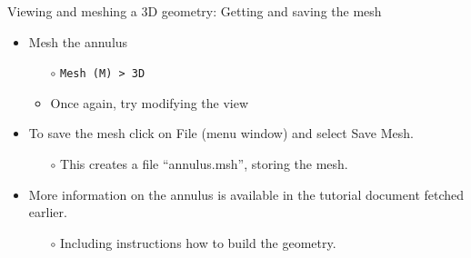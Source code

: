 \documentclass[t]{beamer}
\begin{document}
\begin{frame}{Viewing and meshing a 3D geometry: Getting and saving the mesh}
\begin{itemize}
\item Mesh the annulus
\begin{itemize}
  \item[$\circ$] \lstinline{Mesh (M) > 3D}
  \item[$\circ$] Once again, try modifying the view
\end{itemize}
\vspace{5pt}
\item To save the mesh click on File (menu window) and select Save Mesh.
\begin{itemize}
  \item[$\circ$] This creates a file ``annulus.msh'', storing the mesh.
\end{itemize}
\vspace{5pt}
\item More information on the annulus is available in the tutorial document fetched earlier.
\begin{itemize}
  \item[$\circ$] Including instructions how to build the geometry.
\end{itemize}
\end{itemize}
\end{frame}
\end{document}

